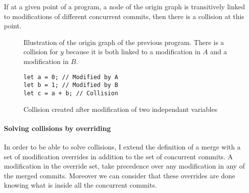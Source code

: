 \documentclass[a4paper,10pt]{article}
\begin{document}
If at a given point of a program, a node of the origin graph is transitively linked to modifications of different concurrent commits, then there is a collision at this point.

\begin{figure}[ht]
\centering{}
\caption{Illustration of the origin graph of the previous program. There is a collision for $y$ because it is both linked to a modification in $A$ and a modification in $B$.}
\end{figure}

\begin{figure}[ht]
\begin{minipage}{.5\textwidth}
\begin{lstlisting}
let a = 0; // Modified by A
let b = 1; // Modified by B
let c = a + b; // Collision
\end{lstlisting}
\end{minipage}\hfill
\begin{minipage}{.45\textwidth}
\centering{}
\end{minipage}
\caption{Collision created after modification of two independant variables}
\end{figure}

\paragraph{Solving collisions by overriding}
In order to be able to solve collisions, I extend the definition of a merge with a set of modification overrides in addition to the set of concurrent commits.
A modification in the override set, take precedence over any modification in any of the merged commits. Moreover we can consider that these overrides are done knowing what is inside all the concurrent commits.
\end{document}
